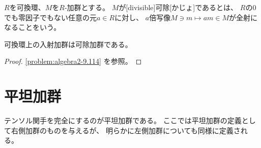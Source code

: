 \documentclass[report]{jlreq}
\begin{document}
\begin{definition}[可除加群]
    $R$を可換環、$M$を$R$-加群とする。
    $M$が[divisible]{可除}[かじょ]であるとは、
    $R$の$0$でも零因子でもない任意の元$a \in R$に対し、
    $a$倍写像$M \ni m \mapsto am \in M$が全射になることをいう。
\end{definition}

\begin{proposition}
    可換環上の入射加群は可除加群である。
\end{proposition}

\begin{proof}
    \cref{problem:algebra2-9.114} を参照。
\end{proof}



%
\section{平坦加群}

テンソル関手を完全にするのが平坦加群である。
ここでは平坦加群の定義として右側加群のものを与えるが、
明らかに左側加群についても同様に定義される。
\end{document}
